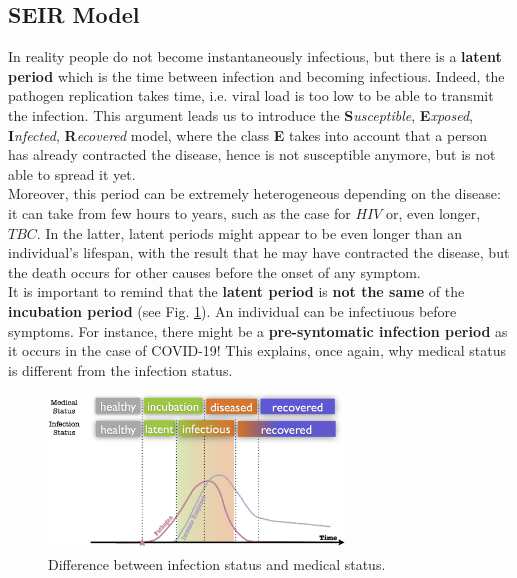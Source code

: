 \documentclass[../main/main.tex]{subfiles}
\begin{document}
\subsection{SEIR Model}

In reality people do not become instantaneously infectious, but there is a \textbf{latent period} which is the time between infection and becoming infectious. Indeed, the pathogen replication takes time, i.e. viral load is too low to be able to transmit the infection. This argument leads us to introduce the \textbf{S}\textit{usceptible},  \textbf{E}\textit{xposed}, \textbf{I}\textit{nfected}, \textbf{R}\textit{ecovered} model, where the class \textbf{E} takes into account that a person has already contracted the disease, hence is not susceptible anymore, but is not able to spread it yet.\\
Moreover, this period can be extremely heterogeneous depending on the disease: it can take from few hours to years, such as the case for $HIV$ or, even longer, $TBC$. In the latter, latent periods might appear to be even longer than an individual's lifespan, with the result that he may have contracted the disease, but the death occurs for other causes before the onset of any symptom.\\
It is important to remind that the \textbf{latent period} is \textbf{not the same} of the \textbf{incubation period} (see Fig. \ref{fig:05_1}). An individual can be infectiuous before symptoms. For instance, there might be a \textbf{pre-syntomatic infection period} as it occurs in the case of COVID-19! This explains, once again, why medical status is different from the infection status.

\begin{figure}[h!]
\centering
\includegraphics[width=0.7\textwidth]{../lessons/image/05/1.png}
\caption{\label{fig:05_1} Difference between infection status and medical status.}
\end{figure}
\end{document}
